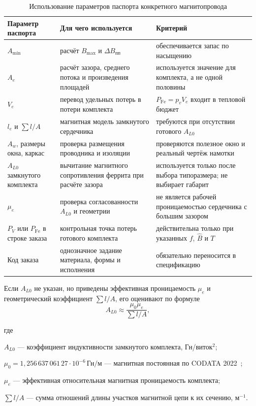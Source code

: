 \documentclass[14pt,a4paper]{extarticle}
\newenvironment{whereblock}
 {\par\noindent где\par
  \begin{list}{}{\setlength{\leftmargin}{12.5mm}
                  \setlength{\itemindent}{-12.5mm}
                  \setlength{\itemsep}{0pt}
                  \setlength{\parsep}{0pt}
                  \setlength{\topsep}{0pt}}}
 {\end{list}}
\newcommand{\whereitem}[2]{\item[] #1 --- #2}
\begin{document}
\begin{table}[H]
\caption{Использование параметров паспорта конкретного магнитопровода}
\label{tab:core-datasheet-map}
\centering
\scriptsize
\begin{tabularx}{\textwidth}{>{\raggedright\arraybackslash}p{30mm}
>{\raggedright\arraybackslash}p{45mm} X}
\toprule
Параметр паспорта & Для чего используется & Критерий \\
\midrule
$A_{\min}$ &
расчёт $B_{\max}$ и $\Delta B_{\text{пп}}$ &
обеспечивается запас по насыщению \\
$A_e$ &
расчёт зазора, среднего потока и произведения площадей &
используется значение для комплекта, а не одной половины \\
$V_e$ &
перевод удельных потерь в потери комплекта &
$P_{\text{Fe}}=p_vV_e$ входит в тепловой бюджет \\
$l_e$ и $\sum l/A$ &
магнитная модель замкнутого сердечника &
требуются при отсутствии готового $A_{L0}$ \\
$A_w$, размеры окна, каркас &
проверка размещения проводника и изоляции &
проверяются полезное окно и реальный чертёж намотки \\
$A_{L0}$ замкнутого комплекта &
вычитание магнитного сопротивления феррита при расчёте зазора &
используется только после выбора типоразмера; не выбирает габарит \\
$\mu_e$ &
проверка согласованности $A_{L0}$ и геометрии &
не является рабочей проницаемостью сердечника с большим зазором \\
$P_V$ или $P_{\text{Fe}}$ в строке заказа &
контрольная точка потерь готового комплекта &
действительна только при указанных $f$, $\widehat B$ и $T$ \\
Код заказа &
однозначное задание материала, формы и исполнения &
обязательно переносится в спецификацию \\
\bottomrule
\end{tabularx}
\end{table}

Если $A_{L0}$ не указан, но приведены эффективная проницаемость
$\mu_e$ и геометрический коэффициент $\sum l/A$, его оценивают по
формуле
\begin{equation}
 A_{L0}\approx
 \frac{\mu_0\mu_e}{\displaystyle\sum l/A},
 \label{eq:al0-from-geometry}
\end{equation}
\begin{whereblock}
\whereitem{$A_{L0}$}{коэффициент индуктивности замкнутого комплекта,
Гн/виток$^2$;}
\whereitem{$\mu_0=1{,}256\,637\,061\,27\cdot10^{-6}\,\text{Гн/м}$}{магнитная
постоянная по CODATA 2022~\cite{codata};}
\whereitem{$\mu_e$}{эффективная относительная магнитная проницаемость
комплекта;}
\whereitem{$\sum l/A$}{сумма отношений длины участков магнитной цепи к их
сечению, м$^{-1}$.}
\end{whereblock}
\end{document}
